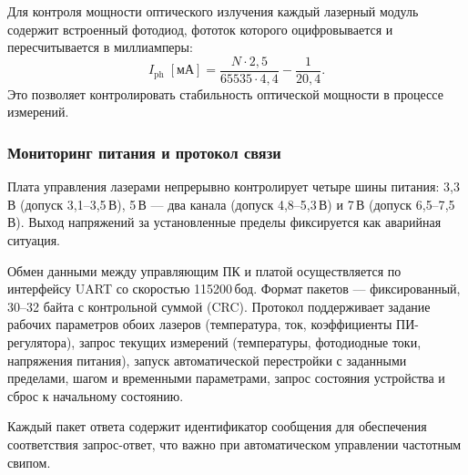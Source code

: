 Для контроля мощности оптического излучения каждый лазерный модуль содержит
встроенный фотодиод, фототок которого оцифровывается и пересчитывается в
миллиамперы:
\begin{equation}
    I_{\mathrm{ph}}\;[\text{мА}] =
    \frac{N \cdot 2{,}5}{65535 \cdot 4{,}4} - \frac{1}{20{,}4}.
    \label{eq:photodiode-current}
\end{equation}
Это позволяет контролировать стабильность оптической мощности в процессе
измерений.

\subsubsection{Мониторинг питания и протокол связи}

Плата управления лазерами непрерывно контролирует четыре шины питания:
3{,}3\,В (допуск 3{,}1--3{,}5\,В), 5\,В --- два канала (допуск
4{,}8--5{,}3\,В) и 7\,В (допуск 6{,}5--7{,}5\,В). Выход напряжений за
установленные пределы фиксируется как аварийная ситуация.

Обмен данными между управляющим ПК и платой осуществляется по интерфейсу UART
со скоростью 115200\,бод. Формат пакетов --- фиксированный, 30--32 байта с
контрольной суммой (CRC). Протокол поддерживает задание рабочих параметров
обоих лазеров (температура, ток, коэффициенты ПИ-регулятора), запрос текущих
измерений (температуры, фотодиодные токи, напряжения питания), запуск
автоматической перестройки с заданными пределами, шагом и временными
параметрами, запрос состояния устройства и сброс к начальному состоянию.

Каждый пакет ответа содержит идентификатор сообщения для обеспечения
соответствия запрос-ответ, что важно при автоматическом управлении частотным
свипом.
